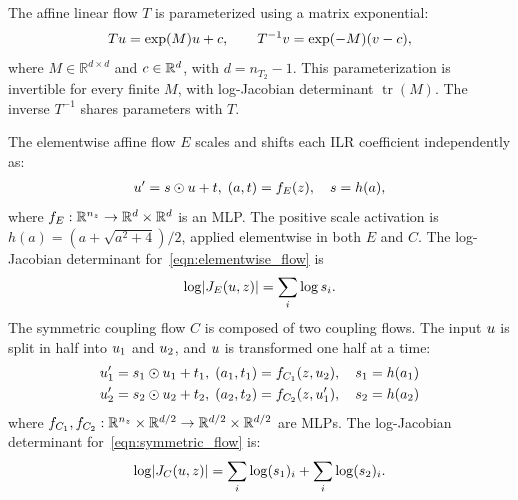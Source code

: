 The affine linear flow $T$ is parameterized using a matrix exponential:
\begin{align}\label{eqn:affine_flow}
    Tu = \exp(M)u + c, \qquad
    T^{-1}v = \exp(-M)(v-c),
\end{align}
where $M\in\mathbb{R}^{d\times d}$ and $c\in\mathbb{R}^{d}$, with $d=n_{T_2}-1$.
This parameterization is invertible for every finite $M$, with log-Jacobian determinant $\operatorname{tr}(M)$.
The inverse $T^{-1}$ shares parameters with $T$.

The elementwise affine flow $E$ scales and shifts each \gls*{ILR} coefficient independently as:
\begin{align}\label{eqn:elementwise_flow}
    u' = s\odot u + t, \;
    (a, t) = f_{E}(z), \quad s=h(a),
\end{align}
where $f_E : \mathbb{R}^{n_{z}} \to \mathbb{R}^{d} \times \mathbb{R}^{d}$ is an \gls*{MLP}.
The positive scale activation is $h(a)=(a+\sqrt{a^2+4})/2$, applied elementwise in both $E$ and $C$.
The log-Jacobian determinant for~\eqref{eqn:elementwise_flow} is
\begin{align}
    \log\AbsDet{\vv{J}_{E}(\vv{u}, \latents)} = \sum_{i}\log\vv{s}_i.
\end{align}
The symmetric coupling flow $C$ is composed of two coupling flows.
The input $u$ is split in half into $u_{1}$ and $u_{2}$, and $u$ is transformed one half at a time:
\begin{align}\label{eqn:symmetric_flow}
    \begin{split}
        u_{1}^{\prime} = s_{1} \odot u_{1} + t_{1}, \; (a_{1}, t_{1}) = f_{C_1}(z, u_{2}), \quad s_{1}=h(a_{1}) \\
        u_{2}^{\prime} = s_{2} \odot u_{2} + t_{2}, \; (a_{2}, t_{2}) = f_{C_2}(z, u_{1}^{\prime}), \quad s_{2}=h(a_{2})
    \end{split}
\end{align}
where $f_{C_1}, f_{C_2}: \mathbb{R}^{n_{z}} \times \mathbb{R}^{d/2} \to \mathbb{R}^{d/2} \times \mathbb{R}^{d/2}$ are \gls*{MLP}s.
The log-Jacobian determinant for~\eqref{eqn:symmetric_flow} is:
\begin{align}
    \log\AbsDet{\vv{J}_{C}(\vv{u}, \latents)} = \sum_{i}\log(\vv{s}_{1})_{i} + \sum_{i}\log(\vv{s}_{2})_{i}.
\end{align}

